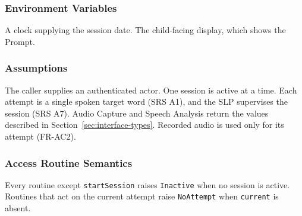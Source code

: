 \documentclass[12pt, titlepage]{article}
\begin{document}
\subsubsection{Environment Variables}
A clock supplying the session date. The child-facing display, which shows the
Prompt.

\subsubsection{Assumptions}
The caller supplies an authenticated actor. One session is active at a time.
Each attempt is a single spoken target word (SRS A1), and the SLP supervises
the session (SRS A7). Audio Capture and Speech Analysis return the values
described in Section~\ref{sec:interface-types}. Recorded audio is used only
for its attempt (FR-AC2).

\subsubsection{Access Routine Semantics}
Every routine except \texttt{startSession} raises \texttt{Inactive} when no
session is active. Routines that act on the current attempt raise
\texttt{NoAttempt} when \texttt{current} is absent.
\end{document}
